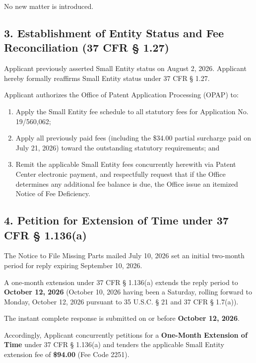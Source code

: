 \documentclass[11pt,letterpaper]{article}
\begin{document}
No new matter is introduced.

\subsection*{3. Establishment of Entity Status and Fee Reconciliation (37 CFR \S{} 1.27)}

Applicant previously asserted Small Entity status on August 2, 2026. Applicant hereby formally reaffirms Small Entity status under 37 CFR \S{} 1.27. 

Applicant authorizes the Office of Patent Application Processing (OPAP) to:
\begin{enumerate}[label=(\alph*), leftmargin=2em, itemsep=2pt, parsep=0pt]
    \item Apply the Small Entity fee schedule to all statutory fees for Application No. 19/560,062;
    \item Apply all previously paid fees (including the \$34.00 partial surcharge paid on July 21, 2026) toward the outstanding statutory requirements; and
    \item Remit the applicable Small Entity fees concurrently herewith via Patent Center electronic payment, and respectfully request that if the Office determines any additional fee balance is due, the Office issue an itemized Notice of Fee Deficiency.
\end{enumerate}

\subsection*{4. Petition for Extension of Time under 37 CFR \S{} 1.136(a)}

The Notice to File Missing Parts mailed July 10, 2026 set an initial two-month period for reply expiring September 10, 2026. 

A one-month extension under 37 CFR \S{} 1.136(a) extends the reply period to \textbf{October 12, 2026} (October 10, 2026 having been a Saturday, rolling forward to Monday, October 12, 2026 pursuant to 35 U.S.C. \S{} 21 and 37 CFR \S{} 1.7(a)). 

The instant complete response is submitted on or before \textbf{October 12, 2026}. 

Accordingly, Applicant concurrently petitions for a \textbf{One-Month Extension of Time} under 37 CFR \S{} 1.136(a) and tenders the applicable Small Entity extension fee of \textbf{\$94.00} (Fee Code 2251).

\newpage
\end{document}
